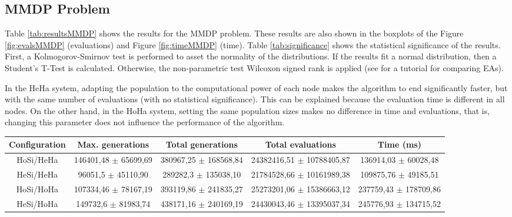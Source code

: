 \subsection{MMDP Problem}

Table \ref{tab:resultsMMDP} shows the results for the MMDP problem. These results are also shown in the boxplots of the Figure \ref{fig:evalsMMDP} (evaluations) and Figure \ref{fig:timeMMDP} (time). Table \ref{tab:significance} shows the statistical significance of the results. First, a Kolmogorov-Smirnov test is performed to asset the normality of the distributions. If the results fit a normal distribution, then a Student's T-Test is calculated. Otherwise, the non-parametric test Wilcoxon signed rank is applied (see \cite{TUTORIAL} for a tutorial for comparing EAs).

 In the HeHa system, adapting the population to the computational power of each node makes the algorithm to end significantly faster, but with the same number of evaluations (with no statistical significance). This can be explained because the evaluation time is different in all nodes. On the other hand, in the HoHa system, setting the same population sizes makes no difference in time and evaluations, that is, changing this parameter does not influence the performance of the algorithm. 

\begin{table*}
\centering
\caption{Results for the MMDP problem.}
\begin{tabular}{|c|c|c|c|c|} \hline
Configuration & Max. generations      & Total generations     &   Total evaluations     & Time (ms) \\ \hline
HoSi/HeHa   & 146401,48 $\pm$ 65699,69  & 380967,25 $\pm$ 168568,84 & 24382416,51 $\pm$ 10788405,87 & 136914,03 $\pm$ 60028,48\\ \hline
HeSi/HeHa   & 96051,5 $\pm$ 45110,90  & 289282,3  $\pm$ 135038,10 & 21784528,66 $\pm$ 10161989,38 & 109875,76 $\pm$ 49185,51\\ \hline \hline
HoSi/HoHa   & 107334,46 $\pm$ 78167,19  & 393119,86 $\pm$ 241835,27 & 25273201,06 $\pm$ 15386663,12 & 237759,43 $\pm$ 178709,86\\ \hline
HeSi/HoHa   & 149732,6 $\pm$ 81983,74 & 438171,16 $\pm$ 240169,19 & 24430043,46 $\pm$ 13395037,34 & 245776,93 $\pm$ 134715,52\\ \hline

\end{tabular}
\label{tab:resultsMMDP}
\end{table*}

